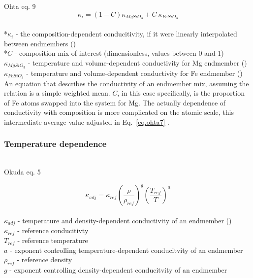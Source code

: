 Ohta eq. 9 
\begin{equation}%
\kappa_{i}=\left ( 1-C \right )\kappa_{MgSiO_{3}}+C\ \kappa_{FeSiO_{3}}
\label{eq.ohta9}
\end{equation}%
\\ *$\kappa_{i}$ - the composition-dependent conducitivity, if it were linearly interpolated between endmembers (\wmk)\\
*$C$ - composition mix of interest (dimensionless, values between 0 and 1)\\
$\kappa_{MgSiO_{3}}$ - temperature and volume-dependent conductivity for Mg endmember (\wmk)\\
$\kappa_{FeSiO_{3}}$ - temperature and volume-dependent conductivity for Fe endmember (\wmk)\\

An equation that describes the conductivity of an endmember mix, assuming the relation is a simple weighted mean. $C$, in this case specifically, is the proportion of Fe atoms swapped into the system for Mg. The actually dependence of conductivity with composition is more complicated on the atomic scale, this intermediate average value adjusted in Eq.~\ref{eq.ohta7} \citep[][Eq. 7]{Ohta2017}. \\

\subsubsection{Temperature dependence}

\cite{Okuda2017}\\

Okuda eq. 5 

\begin{equation}%
\kappa_{adj}=\kappa_{ref}\left ( \frac{\rho}{\rho_{ref}} \right )^{g}\left ( \frac{T_{ref}}{T} \right )^{a}
\label{eq.okuda5}
\end{equation}%
\\ $\kappa_{adj}$ - temperature and density-dependent conductivity of an endmember (\wmk)\\
$\kappa_{ref}$ - reference conducitivty\\
$T_{ref}$ - reference temperature\\
$a$ - exponent controlling temperature-dependent conducitvity of an endmember\\
$\rho_{ref}$ - reference density\\
$g$ - exponent controlling density-dependent conducitvity of an endmember\\

